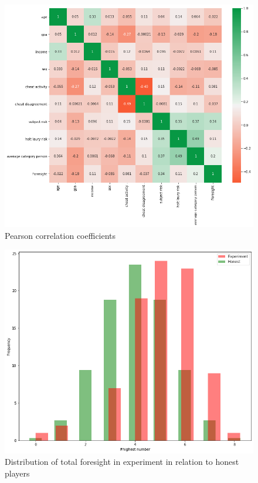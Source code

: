 \documentclass[12pt]{article}
\begin{document}
	
	\begin{figure}[!h]
	\caption{Pearson correlation coefficients}
	\label{corr}
	\includegraphics[scale=0.5]{corr.png}
	\end{figure}

	\begin{figure}[!h]
	\caption{Distribution of total foresight in experiment in relation to honest players}
	\label{hist}
	\includegraphics[scale=0.5]{hist1.png}
	\end{figure}
\end{document}
